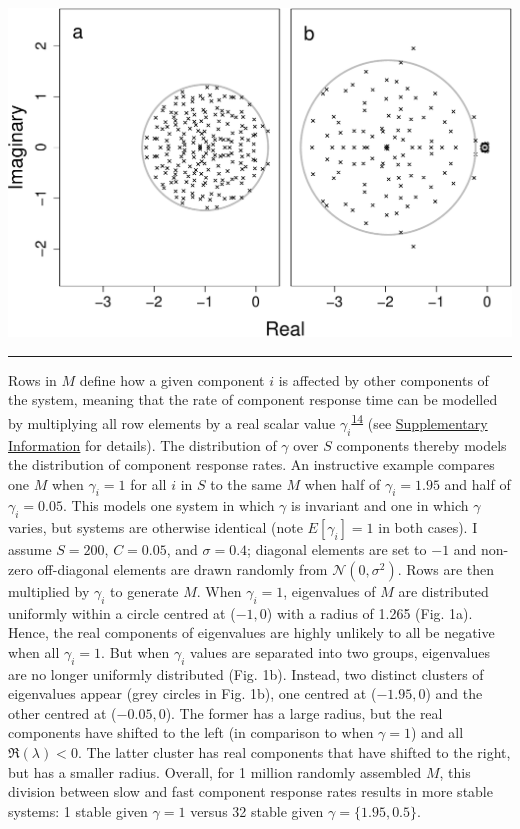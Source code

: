 \documentclass[]{article}
\begin{document}
\includegraphics{unnamed-chunk-4-1.pdf}

\begin{center}\rule{0.5\linewidth}{\linethickness}\end{center}

Rows in \(M\) define how a given component \(i\) is affected by other
components of the system, meaning that the rate of component response
time can be modelled by multiplying all row elements by a real scalar
value
\(\gamma_{i}\)\textsuperscript{\protect\hyperlink{ref-Patel2018}{14}} (see 
\hyperlink{SIstart}{Supplementary Information} for details).
The distribution of \(\gamma\) over \(S\) components thereby models the
distribution of component response rates. An instructive example
compares one \(M\) when \(\gamma_{i} = 1\) for all \(i\) in \(S\) to
the same \(M\) when half of \(\gamma_{i} = 1.95\) and half of
\(\gamma_{i} = 0.05\). This models one system in which \(\gamma\) is
invariant and one in which \(\gamma\) varies, but systems are otherwise
identical (note \(E[\gamma_{i}] = 1\) in both cases). I assume
\(S = 200\), \(C = 0.05\), and \(\sigma = 0.4\); diagonal elements are
set to \(-1\) and non-zero off-diagonal elements are drawn randomly from
\(\mathcal{N}(0, \sigma^{2})\). Rows are then multiplied by
\(\gamma_{i}\) to generate \(M\). When \(\gamma_{i} = 1\), eigenvalues
of \(M\) are distributed uniformly within a circle centred at
(\(-1, 0\)) with a radius of 1.265 (Fig. 1a). Hence, the real components
of eigenvalues are highly unlikely to all be negative when all
\(\gamma_{i} = 1\). But when \(\gamma_{i}\) values are separated into
two groups, eigenvalues are no longer uniformly distributed (Fig. 1b).
Instead, two distinct clusters of eigenvalues appear (grey circles in
Fig. 1b), one centred at (\(-1.95, 0\)) and the other centred at
(\(-0.05, 0\)). The former has a large radius, but the real components
have shifted to the left (in comparison to when \(\gamma = 1\)) and all
\(\Re({\lambda}) < 0\). The latter cluster has real components that have
shifted to the right, but has a smaller radius. Overall, for 1 million
randomly assembled \(M\), this division between slow and fast component
response rates results in more stable systems: 1 stable given
\(\gamma = 1\) versus 32 stable given \(\gamma = \{1.95, 0.5\}\).
\end{document}
